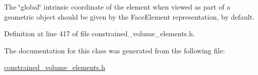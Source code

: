 The \char`\"{}global\char`\"{} intrinsic coordinate of the element when viewed as part of a geometric object should be given by the Face\+Element representation, by default. 



Definition at line 417 of file constrained\+\_\+volume\+\_\+elements.\+h.



The documentation for this class was generated from the following file\+:\begin{DoxyCompactItemize}
\item 
\hyperlink{constrained__volume__elements_8h}{constrained\+\_\+volume\+\_\+elements.\+h}\end{DoxyCompactItemize}
